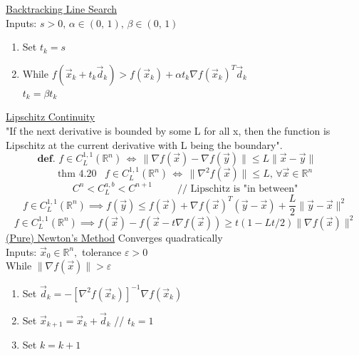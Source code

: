 \documentclass[twocolumn,12pt]{article}    %
\begin{document}
\noindent \underline{Backtracking Line Search}\\
Inputs: \(s>0,\, \alpha \in (0,\,1),\, \beta\in (0,\,1)\)
\begin{enumerate}
    \item Set \(t_k =s\)
    \item While \(f(\vec{x}_k +t_k\vec{d}_k) > f(\vec{x}_k) + \alpha t_k \nabla f(\vec{x}_k)^T \vec{d}_k\)\\
    \hspace{80pt} \(t_k = \beta t_k\)
\end{enumerate}
    
\noindent\underline{Lipschitz Continuity}\\
"If the next derivative is bounded by some L for all x, then the function is Lipschitz at the current derivative with L being the boundary".
\begin{equation*}
    \textbf{def. } f \in C_L^{1,1} (\mathds{R}^n)\, \Longleftrightarrow \,\|\nabla f(\vec{x}) - \nabla f(\vec{y}) \| \leq L\|\vec{x} -\vec{y}\| \hspace{20pt} 
\end{equation*}
\begin{equation*}
    \text{thm }4.20 \hspace{10pt} f \in C_L^{1,1} (\mathds{R}^n)\, \Longleftrightarrow\, \|\nabla^2 f(\vec{x})\| \leq L, \, \forall \vec{x} \in \mathds{R}^n
\end{equation*}
\begin{equation*}
    C^n < C^{a,b}_L < C^{n+1} \hspace{30pt} \text{// Lipschitz is  "in between"}
\end{equation*}
\begin{equation*}
    f \in C_L^{1,1} (\mathds{R}^n) \implies f(\vec{y}) \leq f(\vec{x}) + \nabla f(\vec{x})^T (\vec{y} -\vec{x}) + \frac{L}{2} \|\vec{y} - \vec{x}\|^2
\end{equation*}
\begin{equation*}
    f \in C_L^{1,1} (\mathds{R}^n) \implies f(\vec{x}) - f(\vec{x} -t\nabla f(\vec{x})) \geq t(1-Lt/2)\|\nabla f(\vec{x})\|^2
\end{equation*}
\noindent \underline{(Pure) Newton's Method} \hspace{40pt} Converges quadratically\\
Inputs: \(\vec{x}_0\in \mathds{R}^n,\) tolerance \(\varepsilon >0\)\\
While \(\|\nabla f(\vec{x})\| > \varepsilon\)
\begin{enumerate}
    \item Set \(\vec{d}_k= - [\nabla^2 f(\vec{x}_k)]^{-1} \nabla f (\vec{x}_k)\)
    \item Set \(\vec{x}_{k+1} = \vec{x}_k + \vec{d}_k\) \hspace{30pt} // \(t_k =1\)
    \item Set \(k = k+1\)
\end{enumerate}
\end{document}
